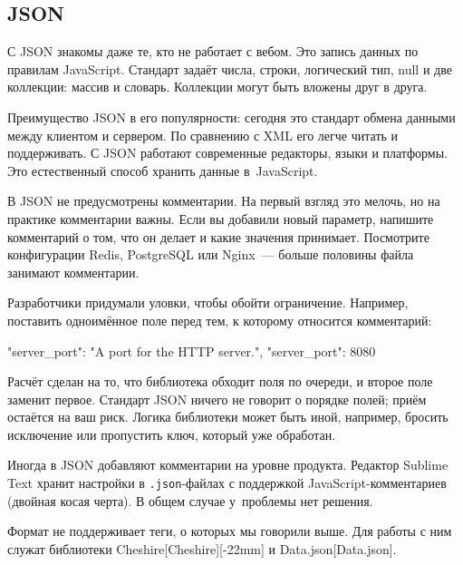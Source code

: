 \subsection{JSON}


С JSON знакомы даже те, кто не работает с вебом. Это запись данных по правилам
JavaScript. Стандарт задаёт числа, строки, логический тип, null и две коллекции:
массив и словарь. Коллекции могут быть вложены друг в друга.


Преимущество JSON в его популярности: сегодня это стандарт обмена данными между
клиентом и сервером. По сравнению с XML его легче читать и поддерживать. С JSON
работают современные редакторы, языки и платформы. Это естественный способ
хранить данные в~JavaScript.

В JSON не предусмотрены комментарии. На первый взгляд это мелочь, но на практике
комментарии важны. Если вы добавили новый параметр, напишите комментарий о том,
что он делает и какие значения принимает. Посмотрите конфигурации Redis,
PostgreSQL или Nginx~--- больше половины файла занимают комментарии.

Разработчики придумали уловки, чтобы обойти ограничение. Например, поставить
одноимённое поле перед тем, к которому относится комментарий:


\begin{english}
  \begin{json}
{
    "server_port": "A port for the HTTP server.",
    "server_port": 8080
}
  \end{json}
\end{english}

Расчёт сделан на то, что библиотека обходит поля по очереди, и второе поле
заменит первое. Стандарт JSON ничего не говорит о порядке полей; приём остаётся
на ваш риск. Логика библиотеки может быть иной, например, бросить исключение или
пропустить ключ, который уже обработан.

Иногда в JSON добавляют комментарии на уровне продукта. Редактор Sublime Text
хранит настройки в \verb|.json|-файлах с поддержкой JavaScript-комментариев (двойная
косая черта). В общем случае у~проблемы нет решения.


Формат не поддерживает теги, о которых мы говорили выше. Для работы с ним служат
библиотеки
Cheshire[Cheshire][-22mm] и
Data.json[Data.json].

